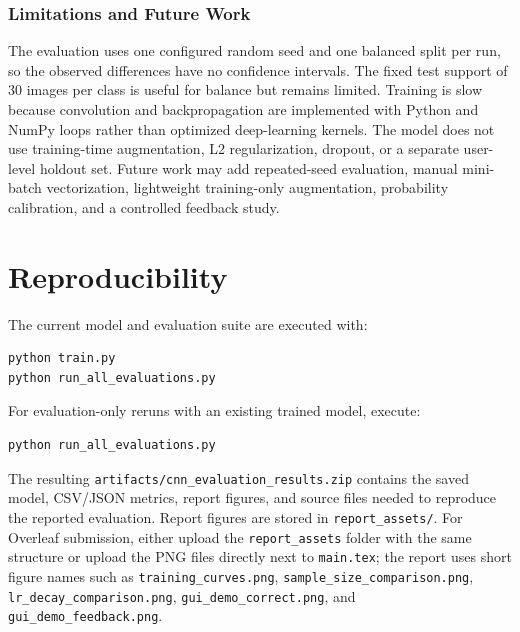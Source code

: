\documentclass[a4paper,12pt]{extreport}
\begin{document}
\subsection*{Limitations and Future Work}
The evaluation uses one configured random seed and one balanced split per run, so the observed differences have no confidence intervals. The fixed test support of 30 images per class is useful for balance but remains limited. Training is slow because convolution and backpropagation are implemented with Python and NumPy loops rather than optimized deep-learning kernels. The model does not use training-time augmentation, L2 regularization, dropout, or a separate user-level holdout set. Future work may add repeated-seed evaluation, manual mini-batch vectorization, lightweight training-only augmentation, probability calibration, and a controlled feedback study.

\appendix
\chapter{Reproducibility}
The current model and evaluation suite are executed with:
\begin{lstlisting}
python train.py
python run_all_evaluations.py
\end{lstlisting}

For evaluation-only reruns with an existing trained model, execute:
\begin{lstlisting}
python run_all_evaluations.py
\end{lstlisting}
The resulting \texttt{artifacts/cnn\_evaluation\_results.zip} contains the saved model, CSV/JSON metrics, report figures, and source files needed to reproduce the reported evaluation. Report figures are stored in \texttt{report\_assets/}. For Overleaf submission, either upload the \texttt{report\_assets} folder with the same structure or upload the PNG files directly next to \texttt{main.tex}; the report uses short figure names such as \texttt{training\_curves.png}, \texttt{sample\_size\_comparison.png}, \texttt{lr\_decay\_comparison.png}, \texttt{gui\_demo\_correct.png}, and \texttt{gui\_demo\_feedback.png}.
\end{document}
